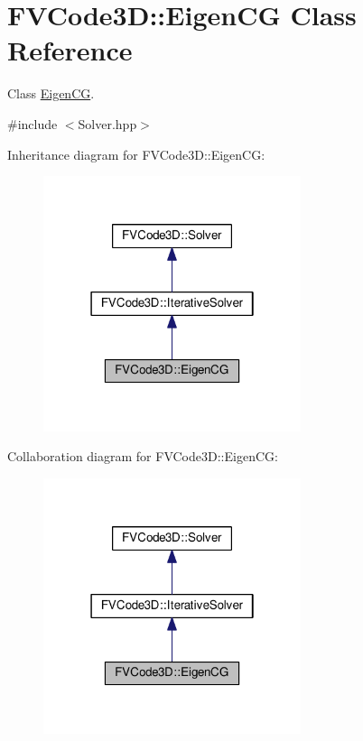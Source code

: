 \hypertarget{classFVCode3D_1_1EigenCG}{}\section{F\+V\+Code3D\+:\+:Eigen\+CG Class Reference}
\label{classFVCode3D_1_1EigenCG}


Class \hyperlink{classFVCode3D_1_1EigenCG}{Eigen\+CG}.  




{\ttfamily \#include $<$Solver.\+hpp$>$}



Inheritance diagram for F\+V\+Code3D\+:\+:Eigen\+CG\+:
\nopagebreak
\begin{figure}[H]
\begin{center}
\leavevmode
\includegraphics[width=214pt]{classFVCode3D_1_1EigenCG__inherit__graph}
\end{center}
\end{figure}


Collaboration diagram for F\+V\+Code3D\+:\+:Eigen\+CG\+:
\nopagebreak
\begin{figure}[H]
\begin{center}
\leavevmode
\includegraphics[width=214pt]{classFVCode3D_1_1EigenCG__coll__graph}
\end{center}
\end{figure}
